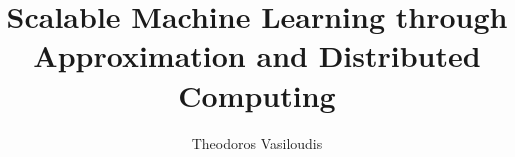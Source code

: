 


\title{Scalable Machine Learning through Approximation and Distributed Computing}
\author{Theodoros Vasiloudis}



